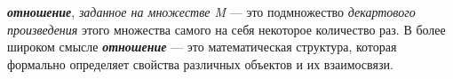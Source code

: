 \begin{comment}		
	
\scnheader{бинарная связь}
\begin{scnsubdividing}
	\scnitem{sc-коннектор}
	\scnitem{неатомарная бинарная связь}
\end{scnsubdividing}
\end{SCn}

Данное разбиение осуществляется на основе синтаксического признака, а не семантического, поскольку каждый \textit{sc-коннектор} может быть записан в памяти при помощи семантически эквивалентной конструкции, содержащей знак самой связи и пары принадлежности, ведущие к ее элементам, уточненные, при необходимости ролевыми отношениями.

Каждый \textbf{\textit{sc-коннектор}} представлен в \textit{sc-памяти} одним \textit{sc-элементом} и семантически эквивалентен конструкции, содержащей знак некоторой \textit{бинарной связи} и пары принадлежности, ведущие к элементам этой связи, уточненные, при необходимости ролевыми отношениями.

Такая конструкция может быть обозначена \textbf{\textit{sc-коннектором}} только в случае, когда роли компонентов соответствующей бинарной связи указываются только при помощи \textit{числовых атрибутов 1\scnrolesign} и \textit{2\scnrolesign} или не уточняются вообще.
	
\textbf{\textit{небинарная связь}} --- \textit{связь}, имеющая больше двух элементов.

\begin{SCn}
	
	\scnheader{неориентированная связь}
	\scnsuperset{неориентированное множество}
	\scnexplanation{\textbf{\textit{неориентированная связь}} --- связь, все элементы которой имеют одинаковые роли (при этом соответствующее ролевое отношение, как правило, явно не указывается).}
	
	\scnheader{ориентированная связь}
	\scnsuperset{кортеж}
	\scnexplanation{\textbf{\textit{ориентированная связь}} --- связь, в которой с помощью ролевых отношений, указываются роли компонентов этой связи.}
	
	\scnheader{отношение}
	\scnidtf{класс связей}
	\scnidtf{класс sc-связок}
	\scnidtf{множество отношений}
	\scnidtf{Множество всевозможных отношений}
	\scntext{определение}{\textbf{\textit{отношение}}, \textit{заданное на множестве M} --- это подмножество \textit{декартового произведения} этого множества самого на себя некоторое количество раз}
\end{SCn}
\end{comment}
\textbf{\textit{отношение}}, \textit{заданное на множестве M} --- это подмножество \textit{декартового произведения} этого множества самого на себя некоторое количество раз. В более широком смысле \textbf{\textit{отношение}} --- это математическая структура, которая формально определяет свойства различных объектов и их взаимосвязи.

